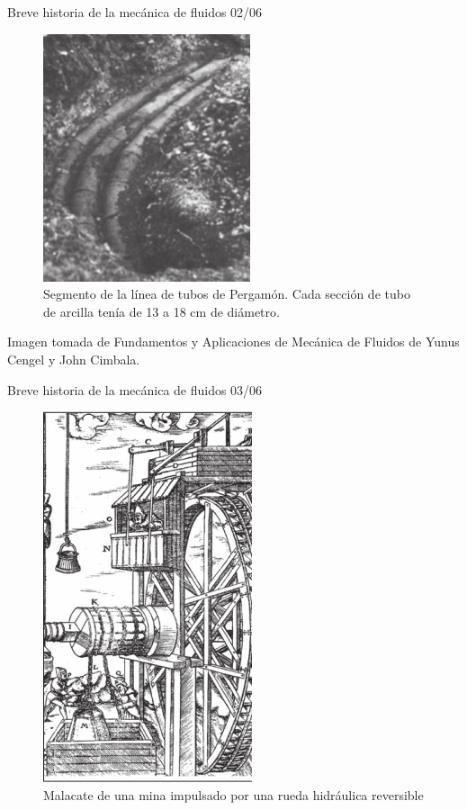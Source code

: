 \begin{frame}{Breve historia de la mecánica de fluidos 02/06}
\justifying
\begin{figure}[H]
\centering
\includegraphics[scale=0.2]{Section_Files/imagenes/sec01_0101_Fig01-12.png}
\caption{Segmento de la línea de tubos de Pergamón. Cada sección de tubo de arcilla tenía de 13 a 18 cm de diámetro.}
\label{fig: Figura1-12}
\end{figure}
Imagen tomada de Fundamentos y Aplicaciones de Mecánica de Fluidos de Yunus Cengel y John Cimbala.
\end{frame}
	
\begin{frame}{Breve historia de la mecánica de fluidos 03/06}
\justifying
\begin{figure}[H]
\centering
\includegraphics[scale=0.25]{Section_Files/imagenes/sec01_0101_Fig01-13.png}
\caption{Malacate de una mina impulsado por una rueda hidráulica reversible}
\label{fig: Figura1-13}
\end{figure}
\end{frame}
	
